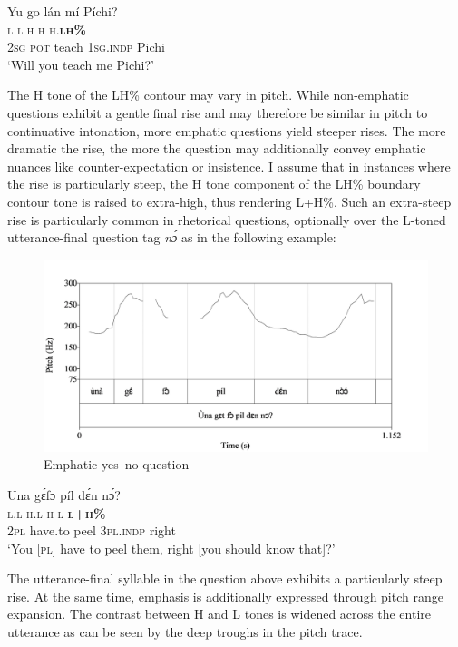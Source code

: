   
 


\ea%
    \label{ex:key:96}
    \glll   Yu    go    lán    mí    Píchi?\\
\textsc{l}    \textsc{l}    \textsc{h}    \textsc{h}    \textsc{h.}\textbf{\textsc{lh\%}}\\
\textsc{2sg}    \textsc{pot}    teach  \textsc{1sg.indp}  Pichi\\
\glt ‘Will you teach me Pichi?’  
\z

The H tone of the LH\% contour may vary in pitch. While non-emphatic questions exhibit a gentle final rise and may therefore be similar in pitch to continuative intonation, more emphatic questions yield steeper rises. The more dramatic the rise, the more the question may additionally convey emphatic nuances like counter-expectation or insistence. I assume that in instances where the rise is particularly steep, the H tone component of the LH\% boundary contour tone is raised to extra-high, thus rendering L+H\%. Such an extra-steep rise is particularly common in rhetorical questions, optionally over the L-toned utterance-final question tag \textit{nɔ́} as in the following example: 

\begin{figure}
\caption{Emphatic yes–no question}
\label{fig:key:3.44}
\includegraphics[height=.3\textheight]{figures/yakpomod-img46.png}
\end{figure}

  
 


\ea%
    \label{ex:key:97}
    \glll   Una    gɛ́fɔ    píl    dɛ́n    nɔ́?\\
\textsc{l.l}    \textsc{h.l}    \textsc{h}    \textsc{l}    \textbf{\textsc{l+h\%}}\\
\textsc{2pl}    have.to  peel    \textsc{3pl.indp}  right\\
\glt ‘You [\textsc{pl}] have to peel them, right [you should know that]?’
\z



The utterance-final syllable in the question above exhibits a particularly steep rise. At the same time, emphasis is additionally expressed through pitch range expansion. The contrast between H and L tones is widened across the entire utterance as can be seen by the deep troughs in the pitch trace.

